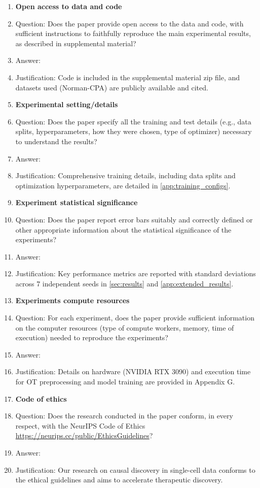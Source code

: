 \begin{enumerate}
\item {\bf Open access to data and code}
    \item[] Question: Does the paper provide open access to the data and code, with sufficient instructions to faithfully reproduce the main experimental results, as described in supplemental material?
    \item[] Answer: \answerYes{}
    \item[] Justification: Code is included in the supplemental material zip file, and datasets used (Norman-CPA) are publicly available and cited.

\item {\bf Experimental setting/details}
    \item[] Question: Does the paper specify all the training and test details (e.g., data splits, hyperparameters, how they were chosen, type of optimizer) necessary to understand the results?
    \item[] Answer: \answerYes{}
    \item[] Justification: Comprehensive training details, including data splits and optimization hyperparameters, are detailed in \cref{app:training_configs}.

\item {\bf Experiment statistical significance}
    \item[] Question: Does the paper report error bars suitably and correctly defined or other appropriate information about the statistical significance of the experiments?
    \item[] Answer: \answerYes{}
    \item[] Justification: Key performance metrics are reported with standard deviations across 7 independent seeds in \cref{sec:results} and \cref{app:extended_results}.

\item {\bf Experiments compute resources}
    \item[] Question: For each experiment, does the paper provide sufficient information on the computer resources (type of compute workers, memory, time of execution) needed to reproduce the experiments?
    \item[] Answer: \answerYes{}
    \item[] Justification: Details on hardware (NVIDIA RTX 3090) and execution time for OT preprocessing and model training are provided in Appendix G.

\item {\bf Code of ethics}
    \item[] Question: Does the research conducted in the paper conform, in every respect, with the NeurIPS Code of Ethics \url{https://neurips.cc/public/EthicsGuidelines}?
    \item[] Answer: \answerYes{}
    \item[] Justification: Our research on causal discovery in single-cell data conforms to the ethical guidelines and aims to accelerate therapeutic discovery.


\end{enumerate}
